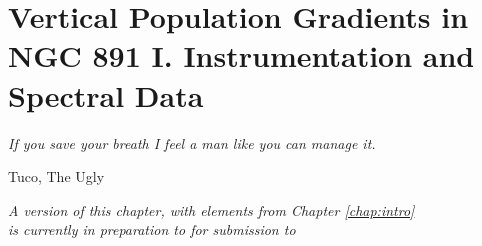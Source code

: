 


\chapter[NGC 891: Observations and spectral data]{Vertical Population
  Gradients in NGC 891 I. Instrumentation and Spectral Data}
\label{chap:891_1}
\epigraph{\fixspacing\emph{If you save your breath I feel a man like
    you can manage it.}}{Tuco, The Ugly}

\vfill
\begin{flushright}
  \fixspacing
  \textit{A version of this chapter, with elements from Chapter \ref{chap:intro}\\
    is currently in preparation to for submission to \apj}
\end{flushright}
\vspace{1in}
\cleardoublepage

